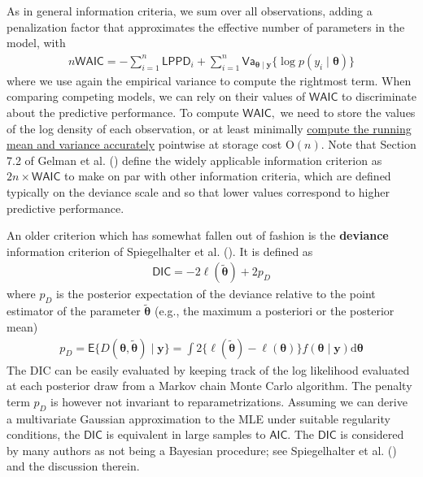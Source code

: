 \documentclass[
  11pt,
  letterpaper,
]{scrbook}
\theoremstyle{definition}
\theoremstyle{plain}
\theoremstyle{plain}
\theoremstyle{plain}
\theoremstyle{definition}
\theoremstyle{definition}
\theoremstyle{remark}
\begin{document}
As in general information criteria, we sum over all observations, adding
a penalization factor that approximates the effective number of
parameters in the model, with \begin{align*}
n\mathsf{WAIC} = -\sum_{i=1}^n \mathsf{LPPD}_i + \sum_{i=1}^n \mathsf{Va}_{\boldsymbol{\theta} \mid \boldsymbol{y}}\{\log p(y_i \mid \boldsymbol{\theta})\}
\end{align*} where we use again the empirical variance to compute the
rightmost term. When comparing competing models, we can rely on their
values of \(\mathsf{WAIC}\) to discriminate about the predictive
performance. To compute \(\mathsf{WAIC},\) we need to store the values
of the log density of each observation, or at least minimally
\href{https://www.johndcook.com/blog/standard_deviation/}{compute the
running mean and variance accurately} pointwise at storage cost
\(\mathrm{O}(n).\) Note that Section 7.2 of Gelman et al.
() define the widely applicable
information criterion as \(2n \times \mathsf{WAIC}\) to make on par with
other information criteria, which are defined typically on the deviance
scale and so that lower values correspond to higher predictive
performance.

An older criterion which has somewhat fallen out of fashion is the
\textbf{deviance} information criterion of Spiegelhalter et al.
(). It is defined as
\begin{align*}
\mathsf{DIC} = -2 \ell(\widetilde{\boldsymbol{\theta}}) + 2 p_D
\end{align*} where \(p_D\) is the posterior expectation of the deviance
relative to the point estimator of the parameter
\(\widetilde{\boldsymbol{\theta}}\) (e.g., the maximum a posteriori or
the posterior mean) \begin{align*}
p_D = \mathsf{E}\{D(\boldsymbol{\theta}, \widetilde{\boldsymbol{\theta}}) \mid \boldsymbol{y}\}= \int 2 \{ \ell(\widetilde{\boldsymbol{\theta}}) - \ell(\boldsymbol{\theta})\} f(\boldsymbol{\theta} \mid \boldsymbol{y}) \mathrm{d} \boldsymbol{\theta}
\end{align*} The DIC can be easily evaluated by keeping track of the log
likelihood evaluated at each posterior draw from a Markov chain Monte
Carlo algorithm. The penalty term \(p_D\) is however not invariant to
reparametrizations. Assuming we can derive a multivariate Gaussian
approximation to the MLE under suitable regularity conditions, the
\(\mathsf{DIC}\) is equivalent in large samples to \(\mathsf{AIC}.\) The
\(\mathsf{DIC}\) is considered by many authors as not being a Bayesian
procedure; see Spiegelhalter et al.
() and the discussion therein.
\end{document}
